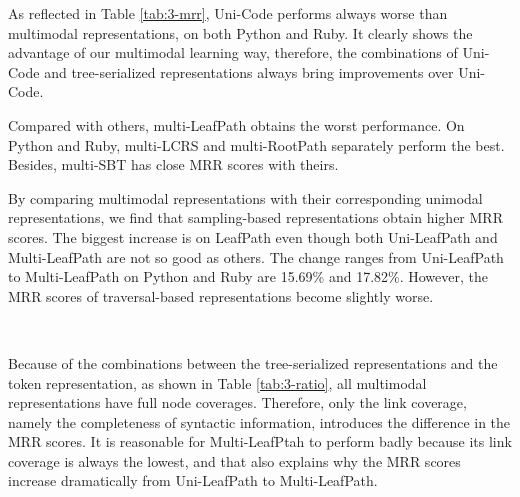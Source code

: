 \documentclass[conference]{IEEEtran}
\begin{document}
As reflected in Table \ref{tab:3-mrr}, Uni-Code performs always worse than multimodal representations, on both Python and Ruby. It clearly shows the advantage of our multimodal learning way, therefore, the combinations of Uni-Code and tree-serialized representations always bring improvements over Uni-Code.

Compared with others, multi-LeafPath obtains the worst performance. On Python and Ruby, multi-LCRS and multi-RootPath separately perform the best. Besides, multi-SBT has close MRR scores with theirs.

By comparing multimodal representations with their corresponding unimodal representations, we find that sampling-based representations obtain higher MRR scores. The biggest increase is on LeafPath even though both Uni-LeafPath and Multi-LeafPath are not so good as others. The change ranges from Uni-LeafPath to Multi-LeafPath on Python and Ruby are 15.69\% and 17.82\%. However, the MRR scores of traversal-based representations become slightly worse.

\begin{table}[thb]
\centering
\caption{Coverage Ratios of Multimodal Representations}
~\\
\label{tab:3-ratio}
\end{table}
 
Because of the combinations between the tree-serialized representations and the token representation, as shown in Table \ref{tab:3-ratio}, all multimodal representations have full node coverages. Therefore, only the link coverage, namely the completeness of syntactic information, introduces the difference in the MRR scores. It is reasonable for Multi-LeafPtah to perform badly because its link coverage is always the lowest, and that also explains why the MRR scores increase dramatically from Uni-LeafPath to Multi-LeafPath.
\end{document}
